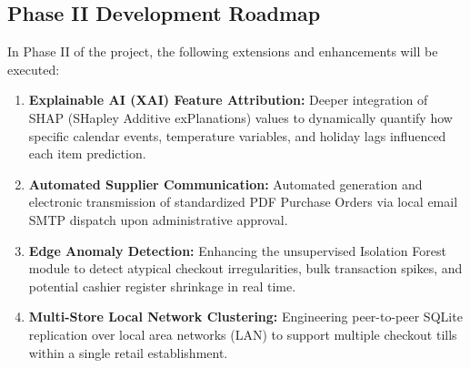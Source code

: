 \subsection{Phase II Development Roadmap}
In Phase II of the project, the following extensions and enhancements will be executed:
\begin{enumerate}
    \item \textbf{Explainable AI (XAI) Feature Attribution:} Deeper integration of SHAP (SHapley Additive exPlanations) values to dynamically quantify how specific calendar events, temperature variables, and holiday lags influenced each item prediction.
    \item \textbf{Automated Supplier Communication:} Automated generation and electronic transmission of standardized PDF Purchase Orders via local email SMTP dispatch upon administrative approval.
    \item \textbf{Edge Anomaly Detection:} Enhancing the unsupervised Isolation Forest module to detect atypical checkout irregularities, bulk transaction spikes, and potential cashier register shrinkage in real time.
    \item \textbf{Multi-Store Local Network Clustering:} Engineering peer-to-peer SQLite replication over local area networks (LAN) to support multiple checkout tills within a single retail establishment.
\end{enumerate}
